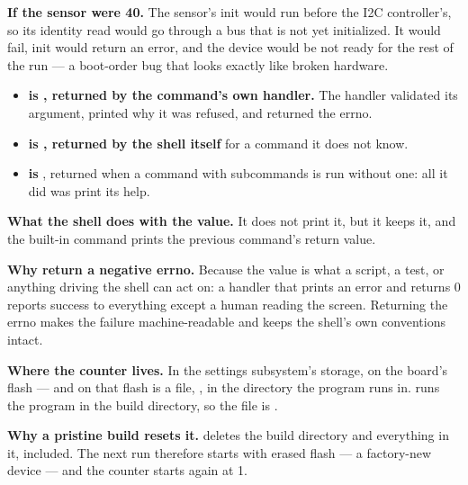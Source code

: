 \textbf{If the sensor were 40.} The sensor's init would run before the I2C controller's, so its
identity read would go through a bus that is not yet initialized. It would fail, init would return
an error, and the device would be not ready for the rest of the run --- a boot-order bug that looks
exactly like broken hardware. 


\begin{itemize}
  \item \textbf{ is , returned by the command's own handler.} The handler
    validated its argument, printed why it was refused, and returned the errno.
  \item \textbf{ is , returned by the shell itself} for a command it does
    not know.
  \item \textbf{ is }, returned when a command with subcommands
    is run without one: all it did was print its help.
\end{itemize}

\textbf{What the shell does with the value.} It does not print it, but it keeps it, and the built-in
 command prints the previous command's return value. 

\textbf{Why return a negative errno.} Because the value is what a script, a test, or anything
driving the shell can act on: a handler that prints an error and returns 0 reports success to
everything except a human reading the screen. Returning the errno makes the failure machine-readable
and keeps the shell's own conventions intact. 

\textbf{Where the counter lives.} In the settings subsystem's storage, on the board's flash --- and
on  that flash is a file, , in the directory the program runs in.
 runs the program in the build directory, so the file is
. 

\textbf{Why a pristine build resets it.}  deletes the build directory and
everything in it,  included. The next run therefore starts with erased flash --- a
factory-new device --- and the counter starts again at 1. 

